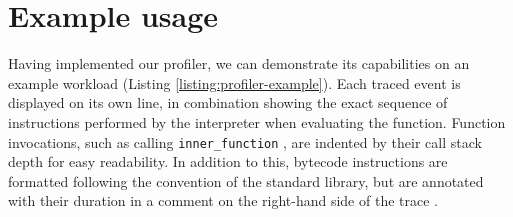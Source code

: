 \section{Example usage}
\label{sec:profiling-bytecode-examples}

Having implemented our profiler, we can demonstrate its capabilities on an example workload (Listing \ref{listing:profiler-example}).
Each traced event is displayed on its own line, in combination showing the exact sequence of instructions performed by the interpreter when evaluating the function. Function invocations, such as calling \texttt{inner\_function} , are indented by their call stack depth for easy readability. In addition to this, bytecode instructions are formatted following the convention of the standard library, but are annotated with their duration in a comment on the right-hand side of the trace .



